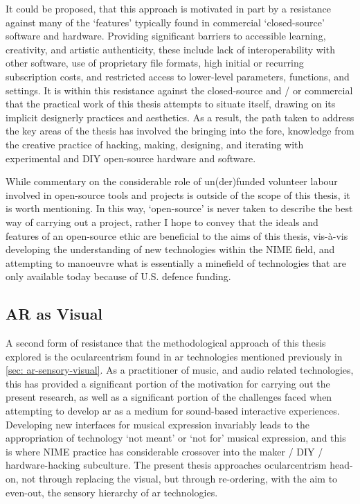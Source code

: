 It could be proposed, that this approach is motivated in part by a resistance against many of the `features' typically found in commercial `closed-source' software and hardware. Providing significant barriers to accessible learning, creativity, and artistic authenticity, these include lack of interoperability with other software, use of proprietary file formats, high initial or recurring subscription costs, and restricted access to lower-level parameters, functions, and settings. It is within this resistance against the closed-source and / or commercial that the practical work of this thesis attempts to situate itself, drawing on its implicit designerly practices and aesthetics. As a result, the path taken to address the key areas of the thesis has involved the bringing into the fore, knowledge from the creative practice of hacking, making, designing, and iterating with experimental and DIY open-source hardware and software.

While commentary on the considerable role of un(der)funded volunteer labour involved in open-source tools and projects is outside of the scope of this thesis, it is worth mentioning. In this way, `open-source' is never taken to describe the best way of carrying out a project, rather I hope to convey that the ideals and features of an open-source ethic are beneficial to the aims of this thesis, vis-à-vis developing the understanding of new technologies within the NIME field, and attempting to manoeuvre what is essentially a minefield of technologies that are only available today because of U.S. defence funding.

\subsection{AR as Visual}\label{sec: method-resistance-ocularcentrism}
A second form of resistance that the methodological approach of this thesis explored is the ocularcentrism found in \gls{ar} technologies mentioned previously in \autoref{sec: ar-sensory-visual}. As a practitioner of music, and audio related technologies, this has provided a significant portion of the motivation for carrying out the present research, as well as a significant portion of the challenges faced when attempting to develop \gls{ar} as a medium for sound-based interactive experiences. Developing new interfaces for musical expression invariably leads to the appropriation of technology `not meant' or `not for' musical expression, and this is where NIME practice has considerable crossover into the maker / DIY / hardware-hacking subculture. The present thesis approaches ocularcentrism head-on, not through replacing the visual, but through re-ordering, with the aim to even-out, the sensory hierarchy of \gls{ar} technologies. 


